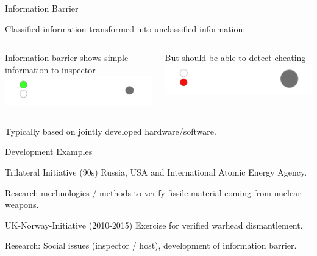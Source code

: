 \documentclass[presentation]{beamer}
\begin{document}
\begin{frame}[label=sec-4-3]{Information Barrier}
\begin{center}
Classified information transformed into unclassified information:
\end{center}

\begin{columns}
\begin{column}{0.48\textwidth}
Information barrier shows simple information to inspector\\[1.5em]

\includegraphics[width=\textwidth]{images/ib/ib_good}
\end{column}

\begin{column}{0.48\textwidth}
But should be able to detect cheating\\[1.5em]
\includegraphics[width=\textwidth]{images/ib/ib_bad}
\end{column}
\end{columns}


\begin{center}
Typically based on jointly developed hardware/software.
\end{center}
\end{frame}

\begin{frame}[label=sec-4-4]{Development Examples}
\begin{block}{Trilateral Initiative (90s)}
Russia, USA and International Atomic Energy Agency.

Research mechnologies / methods to verify fissile material coming from nuclear weapons.
\end{block}

\begin{block}{UK-Norway-Initiative (2010-2015)}
Exercise for verified warhead dismantlement.

Research: Social issues (inspector / host), development of information barrier.
\end{block}
\end{frame}
\end{document}

